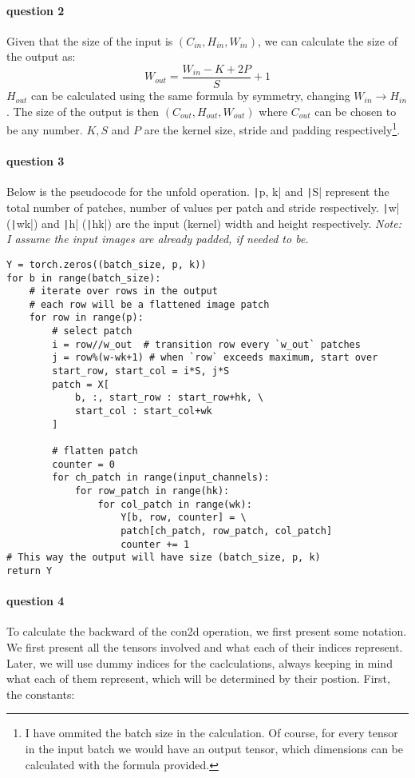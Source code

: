 \documentclass{article}
\begin{document}
\paragraph{question 2} Given that the size of the input is \((C_{in}, H_{in}, W_{in})\), we can calculate the size of the output as:
\[
    W_{out} = \frac{W_{in} - K + 2P}{S} + 1
\]
\(H_{out}\) can be calculated using the same formula by symmetry, changing \(W_{in} \rightarrow H_{in}\). The size of the output is then \((C_{out}, H_{out}, W_{out})\) where \(C_{out}\) can be chosen to be any number. \(K, S\) and \(P\) are the kernel size, stride and padding respectively\footnote{I have ommited the batch size in the calculation. Of course, for every tensor in the input batch we would have an output tensor, which dimensions can be calculated with the formula provided.}.

\paragraph{question 3} Below is the pseudocode for the unfold operation. \texttt|p, k| and \texttt|S| represent the total number of patches, number of values per patch and stride respectively. \texttt|w| (\texttt|wk|) and \texttt|h| (\texttt|hk|) are the input (kernel) width and height respectively. \emph{Note: I assume the input images are already padded, if needed to be.}

\begin{verbatim}
Y = torch.zeros((batch_size, p, k))
for b in range(batch_size):
    # iterate over rows in the output
    # each row will be a flattened image patch
    for row in range(p):
        # select patch
        i = row//w_out  # transition row every `w_out` patches
        j = row%(w-wk+1) # when `row` exceeds maximum, start over
        start_row, start_col = i*S, j*S
        patch = X[
            b, :, start_row : start_row+hk, \
            start_col : start_col+wk
        ]

        # flatten patch
        counter = 0
        for ch_patch in range(input_channels):
            for row_patch in range(hk):
                for col_patch in range(wk):
                    Y[b, row, counter] = \
                    patch[ch_patch, row_patch, col_patch]
                    counter += 1
# This way the output will have size (batch_size, p, k)
return Y
\end{verbatim}

\paragraph{question 4} To calculate the backward of the con2d operation, we first present some notation. We first present all the tensors involved and what each of their indices represent. Later, we will use dummy indices for the caclculations, always keeping in mind what each of them represent, which will be determined by their postion. First, the constants:
\end{document}
